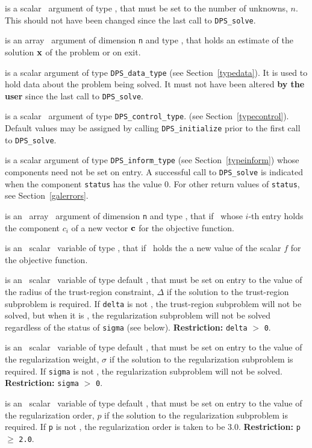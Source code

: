 \documentclass{galahad}
\newcommand{\packagename}{DPS}
\begin{document}
\begin{description}

 is a scalar \intentin\ argument of type \integer, that must be
set to the number of unknowns, $n$. This should not have been changed
since the last call to {\tt \packagename\_solve}.

 is an array \intentout\ argument of dimension {\tt n} and
type \realdp, that holds an estimate of the solution ${\mathbf{x}}$
of the problem  or  on exit.

 is a scalar \intentinout argument of type
{\tt \packagename\_data\_type}
(see Section~\ref{typedata}). It is used to hold data about the problem being
solved. It must not have been altered {\bf by the user} since the last call to
{\tt \packagename\_solve}.

 is a scalar \intentin\ argument of type
{\tt \packagename\_control\_type}.
(see Section~\ref{typecontrol}).
Default values may be assigned by calling {\tt \packagename\_initialize}
prior to the first call to {\tt \packagename\_solve}.

 is a scalar \intentinout argument of type
{\tt \packagename\_inform\_type}
(see Section~\ref{typeinform}) whose components need not be set on entry.
A successful call to
{\tt \packagename\_solve}
is indicated when the  component {\tt status} has the value 0.
For other return values of {\tt status}, see Section~\ref{galerrors}.

 is an \optional\ array \intentin\ argument of dimension {\tt n} and
type \realdp, that if \present\ whose $i$-th entry holds the
component $c_i$ of a new vector ${\mathbf{c}}$ for the objective function.

 is an \optional\ scalar \intentin\ variable of type \realdp,
that if \present\ holds the a new value of the scalar
$f$ for the objective function.

 is an \optional\ scalar \intentin\ variable of type default
\realdp, that must be set on entry
to the value of the radius of the trust-region constraint, $\Delta$
if the solution to the trust-region subproblem  is required.
If {\tt delta} is not \present, the trust-region subproblem will not be
solved, but when it is \present, the regularization subproblem will not be
solved regardless of the status of {\tt sigma} (see below).
{\bf Restriction: } {\tt delta} $>$ {\tt 0}.

 is an \optional\ scalar \intentin\ variable of type default
\realdp, that must be set on entry
to the value of the regularization weight, $\sigma$
if the solution to the regularization subproblem  is required.
If {\tt sigma} is not \present, the regularization subproblem will not be
solved.
{\bf Restriction: } {\tt sigma} $>$ {\tt 0}.

 is an \optional\ scalar \intentin\ variable of type default
\realdp, that must be set on entry
to the value of the regularization order, $p$
if the solution to the regularization subproblem  is required.
If {\tt p} is not \present, the regularization order is taken to be
$3.0$.
{\bf Restriction: } {\tt p} $\geq$ {\tt 2.0}.


\end{description}
\end{document}
